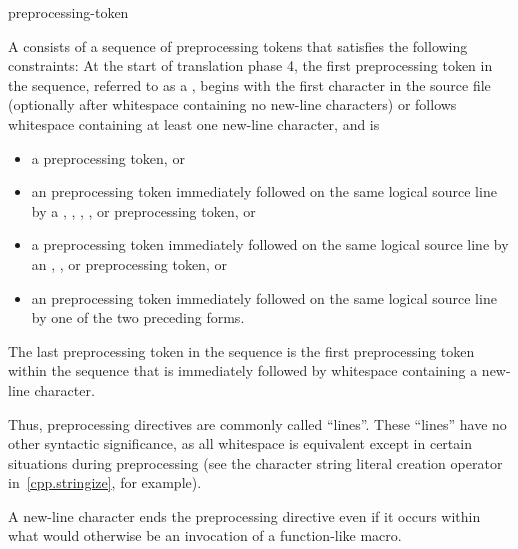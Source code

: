 \begin{bnf}
\br
    preprocessing-token 
\end{bnf}

\begin{bnf}
\br
\end{bnf}

\pnum
A  consists of a sequence of preprocessing tokens
that satisfies the following constraints:
At the start of translation phase 4,
the first preprocessing token in the sequence,
referred to as a ,
begins with the first character in the source file
(optionally after whitespace containing no new-line characters) or
follows whitespace containing at least one new-line character,
and is

\begin{itemize}
\item
a \tcode{\#} preprocessing token, or

\item
an  preprocessing token
immediately followed on the same logical source line by a
,
\tcode{<},
,
, or
\tcode{:}
preprocessing token, or

\item
a  preprocessing token
immediately followed on the same logical source line by an
,
\tcode{:}, or
\tcode{;}
preprocessing token, or

\item
an  preprocessing token
immediately followed on the same logical source line by
one of the two preceding forms.
\end{itemize}

The last preprocessing token in the sequence is the first preprocessing token within the sequence that
is immediately followed by whitespace containing a new-line character.
\begin{footnote}
Thus,
preprocessing directives are commonly called ``lines''.
These ``lines'' have no other syntactic significance,
as all whitespace is equivalent except in certain situations
during preprocessing (see the
\tcode{\#}
character string literal creation operator in~\ref{cpp.stringize}, for example).
\end{footnote}
\begin{note}
A new-line character ends the preprocessing directive even if it occurs
within what would otherwise be an invocation of a function-like macro.
\end{note}

